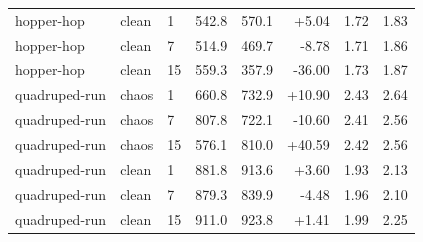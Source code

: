 \begin{longtable}{lllrrrrr}
hopper-hop & clean & 1 & 542.8 & 570.1 & +5.04 & 1.72 & 1.83 \\
hopper-hop & clean & 7 & 514.9 & 469.7 & -8.78 & 1.71 & 1.86 \\
hopper-hop & clean & 15 & 559.3 & 357.9 & -36.00 & 1.73 & 1.87 \\
quadruped-run & chaos & 1 & 660.8 & 732.9 & +10.90 & 2.43 & 2.64 \\
quadruped-run & chaos & 7 & 807.8 & 722.1 & -10.60 & 2.41 & 2.56 \\
quadruped-run & chaos & 15 & 576.1 & 810.0 & +40.59 & 2.42 & 2.56 \\
quadruped-run & clean & 1 & 881.8 & 913.6 & +3.60 & 1.93 & 2.13 \\
quadruped-run & clean & 7 & 879.3 & 839.9 & -4.48 & 1.96 & 2.10 \\
quadruped-run & clean & 15 & 911.0 & 923.8 & +1.41 & 1.99 & 2.25 \\
\bottomrule
\end{longtable}
\endgroup

